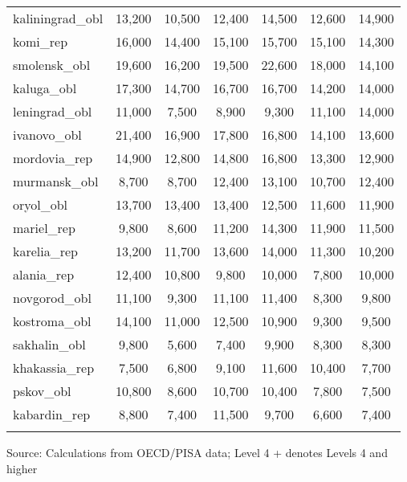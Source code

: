 \documentclass[alpha-refs,fleqn]{wiley-article_p2}
\begin{document}
\begin{table}[h]
\begin{threeparttable}
\begin{tabular}{p{5.5cm}cccccc}
kaliningrad\_obl	&	13,200	&	10,500	&	12,400	&	14,500	&	12,600	&	14,900	\\
komi\_rep	&	16,000	&	14,400	&	15,100	&	15,700	&	15,100	&	14,300	\\
smolensk\_obl	&	19,600	&	16,200	&	19,500	&	22,600	&	18,000	&	14,100	\\
kaluga\_obl	&	17,300	&	14,700	&	16,700	&	16,700	&	14,200	&	14,000	\\
leningrad\_obl	&	11,000	&	7,500	&	8,900	&	9,300	&	11,100	&	14,000	\\
\rowcolor{pink!20}
ivanovo\_obl	&	21,400	&	16,900	&	17,800	&	16,800	&	14,100	&	13,600	\\
mordovia\_rep	&	14,900	&	12,800	&	14,800	&	16,800	&	13,300	&	12,900	\\
murmansk\_obl	&	8,700	&	8,700	&	12,400	&	13,100	&	10,700	&	12,400	\\
oryol\_obl	&	13,700	&	13,400	&	13,400	&	12,500	&	11,600	&	11,900	\\
mariel\_rep	&	9,800	&	8,600	&	11,200	&	14,300	&	11,900	&	11,500	\\
karelia\_rep	&	13,200	&	11,700	&	13,600	&	14,000	&	11,300	&	10,200	\\
alania\_rep	&	12,400	&	10,800	&	9,800	&	10,000	&	7,800	&	10,000	\\
novgorod\_obl	&	11,100	&	9,300	&	11,100	&	11,400	&	8,300	&	9,800	\\
kostroma\_obl	&	14,100	&	11,000	&	12,500	&	10,900	&	9,300	&	9,500	\\
sakhalin\_obl	&	9,800	&	5,600	&	7,400	&	9,900	&	8,300	&	8,300	\\
khakassia\_rep	&	7,500	&	6,800	&	9,100	&	11,600	&	10,400	&	7,700	\\
pskov\_obl	&	10,800	&	8,600	&	10,700	&	10,400	&	7,800	&	7,500	\\
kabardin\_rep	&	8,800	&	7,400	&	11,500	&	9,700	&	6,600	&	7,400	\\
 	&	\hspace{4em}	&	\hspace{4em}	&	\hspace{4em}	&	\hspace{4em} &	\hspace{4em} &	\hspace{4em}	\\
\hline  %
\end{tabular}
\begin{tablenotes}
\item Source: Calculations from OECD/PISA data; Level 4 + denotes Levels 4 and higher
\end{tablenotes}
\end{threeparttable}
\end{table}
\end{document}
